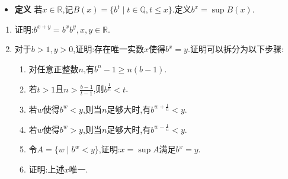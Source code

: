 \documentclass[
  a4paper,
]{ctexart}
\providecommand{\tightlist}{\setlength{\itemsep}{0pt}\setlength{\parskip}{0pt}}
\begin{document}
\begin{itemize}
\tightlist
\item
  \textbf{定义}
  若\(x \in \mathbb{R}\),记\(B(x)=\{ b^t \mid t \in \mathbb{Q},t \leq x \}\).定义\(b^x=\sup B(x)\).
\end{itemize}

\begin{enumerate}
\def\labelenumi{\arabic{enumi}.}
\setcounter{enumi}{10}
\tightlist
\item
  证明:\(b^{x+y}=b^xb^y,x,y \in \mathbb{R}\).
\item
  对于\(b>1,y>0\),证明:存在唯一实数\(x\)使得\(b^x=y\).证明可以拆分为以下步骤:

  \begin{enumerate}
  \def\labelenumii{\arabic{enumii}.}
  \tightlist
  \item
    对任意正整数\(n\),有\(b^n-1 \geq n(b-1)\).
  \item
    若\(t>1\)且\(n>\frac{b-1}{t-1}\),则\(b^\frac{1}{n}<t\).
  \item
    若\(w\)使得\(b^w<y\),则当\(n\)足够大时,有\(b^{w+\frac{1}{n}}<y\).
  \item
    若\(w\)使得\(b^w>y\),则当\(n\)足够大时,有\(b^{w-\frac{1}{n}}<y\).
  \item
    令\(A=\{ w \mid b^w<y \}\),证明:\(x=\sup A\)满足\(b^x=y\).
  \item
    证明:上述\(x\)唯一.
  \end{enumerate}
\end{enumerate}
\end{document}
